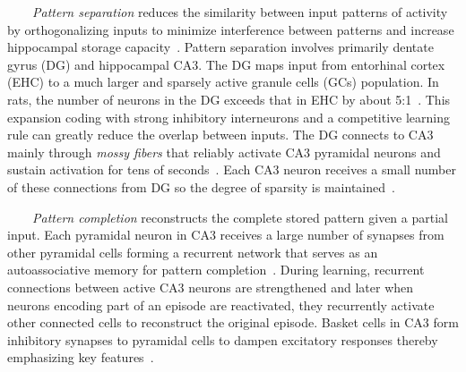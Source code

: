 
\begin{center}
  \begin{tcolorbox}[breakable,sharp corners=all,coltitle=black,colbacktitle=white,
    width=\textwidth,boxsep=5pt,left=5pt,right=5pt,
    title={\textbf{Box A: Pattern Separation, Completion and Integration}}]



~~~~{\it{Pattern separation}} reduces the similarity between input patterns of activity by orthogonalizing inputs to minimize interference between patterns and increase hippocampal storage capacity~\cite{KesnerandRollsNBR-15}. Pattern separation involves primarily dentate gyrus (DG) and hippocampal CA3. The DG maps input from entorhinal cortex (EHC) to a much larger and sparsely active granule cells (GCs) population. In rats, the number of neurons in the DG exceeds that in EHC by about 5:1~\cite{DrewetalLEARNING-MEMORY-13}. This expansion coding with strong inhibitory interneurons and a competitive learning rule can greatly reduce the overlap between inputs. The DG connects to CA3 mainly through {\it{mossy fibers}} that reliably activate CA3 pyramidal neurons and sustain activation for tens of seconds~\cite{VyletaetalELIFE-16}. Each CA3 neuron receives a small number of these connections from DG so the degree of sparsity is maintained~\cite{KesnerandRollsNBR-15}.

~~~~{\it{Pattern completion}} reconstructs the complete stored pattern given a partial input. Each pyramidal neuron in CA3 receives a large number of synapses from other pyramidal cells forming a recurrent network that serves as an autoassociative memory for pattern completion~\cite{KesnerandRollsNBR-15}. During learning, recurrent connections between active CA3 neurons are strengthened and later when neurons encoding part of an episode are reactivated, they recurrently activate other connected cells to reconstruct the original episode. Basket cells in CA3 form inhibitory synapses to pyramidal cells to dampen excitatory responses thereby emphasizing key features~\cite{NeunuebelandKnierimNEURON-14}. 


\end{tcolorbox}
\end{center}
